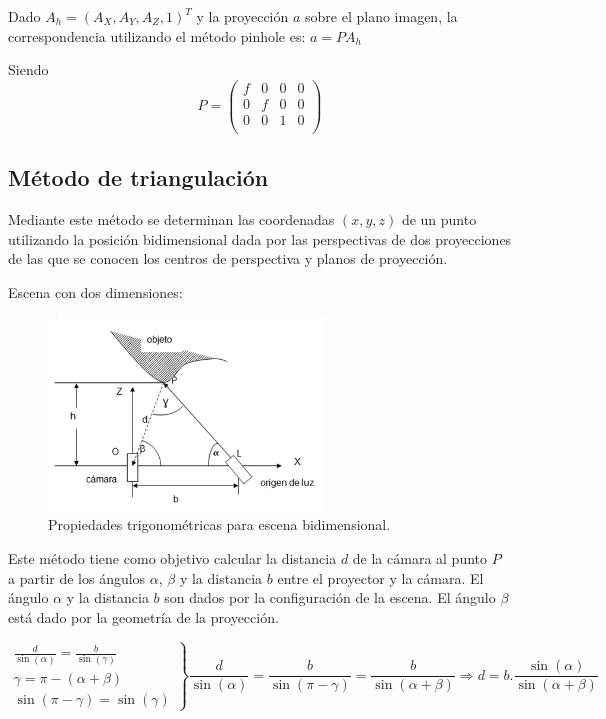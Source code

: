 Dado $A_h = (A_X,A_Y,A_Z,1)^T$ y la proyección $a$ sobre el plano imagen, la correspondencia utilizando el método pinhole es:
$a=PA_h$

Siendo
\[
P = 
\begin{pmatrix}
f & 0 & 0 & 0 \\
0 & f & 0 & 0 \\
0 & 0 & 1 & 0 \\
\end{pmatrix}
\]

\subsection{Método de triangulación}

Mediante este método se determinan las coordenadas $(x,y,z)$ de un punto utilizando la posición bidimensional dada por las perspectivas de dos proyecciones de las que se conocen los centros de perspectiva y planos de proyección\cite{PresUnivYonsei}.

Escena con dos dimensiones:

\begin{figure}[H]
  \centering
    \includegraphics[width=0.65\textwidth]{./Cap6_reconstruccion/triangulacion.PNG}
  \caption{Propiedades trigonométricas para escena bidimensional.}
  \label{fig:Triangulacion}
\end{figure}

Este método tiene como objetivo calcular la distancia $d$ de la cámara al punto $P$ a partir de los ángulos $\alpha$, $\beta$ y la distancia $b$ entre el proyector y la cámara.
El ángulo $\alpha$ y la distancia $b$ son dados por la configuración de la escena.
El ángulo $\beta$ está dado por la geometría de la proyección.

\[
\left.
\begin{array}{l}
\frac{d}{\sin (\alpha)} = \frac{b}{\sin (\gamma)} 	\\
\gamma = \pi - (\alpha + \beta)						\\
\sin (\pi - \gamma) = \sin (\gamma)
\end{array}
\right \rbrace
\frac{d}{\sin(\alpha)} = \frac{b}{\sin(\pi - \gamma)} = \frac{b}{\sin(\alpha + \beta)} \Rightarrow d = b . \frac{\sin(\alpha)}{\sin(\alpha + \beta)}
\]

